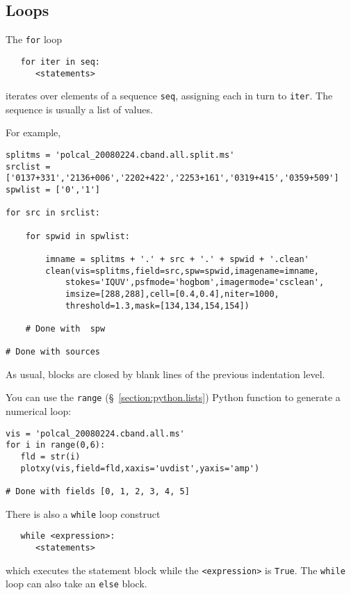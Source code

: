 \subsection{Loops}
\label{section:python.control.loops}

The {\tt for} loop 
\small
\begin{verbatim}
   for iter in seq:
      <statements>
\end{verbatim}
\normalsize
iterates over elements of a sequence {\tt seq}, assigning each in turn to
{\tt iter}.  The sequence is usually a list of values. 

For example,
\small
\begin{verbatim}
splitms = 'polcal_20080224.cband.all.split.ms'
srclist = ['0137+331','2136+006','2202+422','2253+161','0319+415','0359+509']
spwlist = ['0','1']

for src in srclist:
    
    for spwid in spwlist:

        imname = splitms + '.' + src + '.' + spwid + '.clean'
        clean(vis=splitms,field=src,spw=spwid,imagename=imname,
            stokes='IQUV',psfmode='hogbom',imagermode='csclean',
            imsize=[288,288],cell=[0.4,0.4],niter=1000,
            threshold=1.3,mask=[134,134,154,154])
    
    # Done with  spw

# Done with sources
\end{verbatim}
\normalsize
As usual, blocks are closed by blank lines of the previous indentation
level.

You can use the {\tt range} (\S~\ref{section:python.lists}) Python
function to generate a numerical loop:
\small
\begin{verbatim}
vis = 'polcal_20080224.cband.all.ms'
for i in range(0,6):
   fld = str(i)
   plotxy(vis,field=fld,xaxis='uvdist',yaxis='amp')

# Done with fields [0, 1, 2, 3, 4, 5]
\end{verbatim}
\normalsize

There is also a {\tt while} loop construct
\small
\begin{verbatim}
   while <expression>:
      <statements>
\end{verbatim}
\normalsize
which executes the statement block while the {\tt <expression>} 
is {\tt True}.  The {\tt while} loop can also take an {\tt else}
block.

